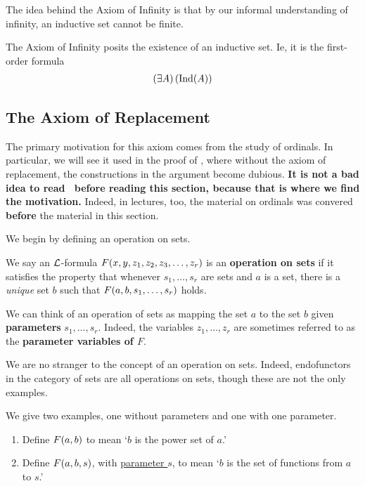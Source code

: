 The idea behind the Axiom of Infinity is that by our informal understanding of infinity, an inductive set cannot be finite.

\begin{baxiom}\label{ZF:Infinity}
    The Axiom of Infinity posits the existence of an inductive set. Ie, it is the first-order formula
    \begin{align*}
        \left( \exists A \right)\left( \operatorname{Ind}(A) \right)
    \end{align*}
\end{baxiom}

\subsection{The Axiom of Replacement}

The primary motivation for this axiom comes from the study of ordinals. In particular, we will see it used in the proof of \sorry, where without the axiom of replacement, the constructions in the argument become dubious. \textbf{It is not a bad idea to read \sorry\ before reading this section, because that is where we find the motivation.} Indeed, in lectures, too, the material on ordinals was convered \textbf{before} the material in this section.

We begin by defining an operation on sets.

\begin{boxdefinition}
    We say an $\mathcal{L}$-formula $F\!\left( x, y, z_1, z_2, z_3, \ldots, z_r \right)$ is an \textbf{operation on sets} if it satisfies the property that whenever $s_1, \ldots, s_r$ are sets and $a$ is a set, there is a \textit{unique} set $b$ such that $F\!\left( a, b, s_1, \ldots, s_r \right)$ holds.
\end{boxdefinition}

We can think of an operation of sets as mapping the set $a$ to the set $b$ given \textbf{parameters} $s_1, \ldots, s_r$. Indeed, the variables $z_1, \ldots, z_r$ are sometimes referred to as the \textbf{parameter variables of $F$}.

We are no stranger to the concept of an operation on sets. Indeed, endofunctors in the category of sets are all operations on sets, though these are not the only examples.

\begin{boxexample}
     We give two examples, one without parameters and one with one parameter.
     \begin{enumerate}
         \item Define $F\!\left( a, b \right)$ to mean `$b$ is the power set of $a$.'
         \item Define $F\!\left( a, b, s \right)$, with \underline{parameter $s$}, to mean `$b$ is the set of functions from $a$ to $s$.'
     \end{enumerate}
\end{boxexample}

